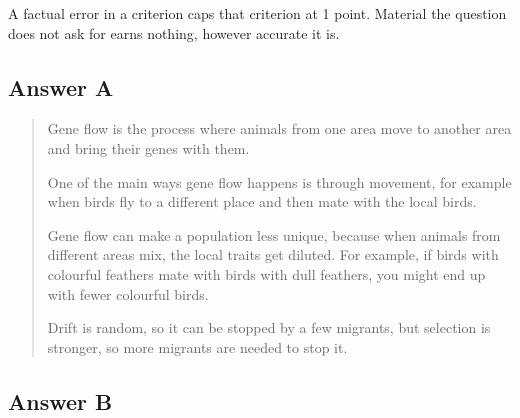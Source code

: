 \documentclass[
  a4paper]{book}
\begin{document}
A factual error in a criterion caps that criterion at 1 point. Material the question does not ask for earns nothing, however accurate it is.

\subsection{Answer A}\label{answer-a}

\begin{quote}
Gene flow is the process where animals from one area move to another area and bring their genes with them.

One of the main ways gene flow happens is through movement, for example when birds fly to a different place and then mate with the local birds.

Gene flow can make a population less unique, because when animals from different areas mix, the local traits get diluted. For example, if birds with colourful feathers mate with birds with dull feathers, you might end up with fewer colourful birds.

Drift is random, so it can be stopped by a few migrants, but selection is stronger, so more migrants are needed to stop it.
\end{quote}

\subsection{Answer B}\label{answer-b}
\end{document}
